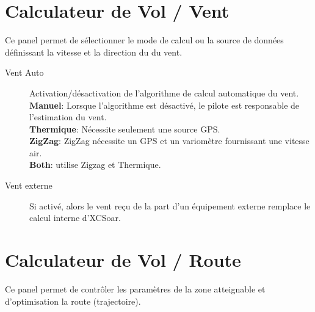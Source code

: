 \section{Calculateur de Vol / Vent} \label{sec:wind}

Ce panel permet de sélectionner le mode de calcul ou la source de données définissant la vitesse et la direction du du vent.

\begin{description}
\item[Vent Auto]  \label{conf:autowind} Activation/désactivation de l'algorithme de calcul automatique du vent.\\
  {\bf Manuel}: Lorsque l'algorithme est désactivé, le pilote est responsable de l'estimation du vent. \\
  {\bf Thermique}: Nécessite seulement une source GPS. \\
  {\bf ZigZag}: ZigZag nécessite un GPS et un variomètre fournissant une vitesse air. \\
  {\bf Both}:  utilise Zigzag et Thermique.
\item[Vent externe]  Si activé, alors le vent reçu de la part d'un  équipement externe remplace le calcul interne d'XCSoar.
\end{description}


\section{Calculateur de Vol / Route}

Ce panel permet de contrôler les paramètres de la zone atteignable et d'optimisation la route (trajectoire).

